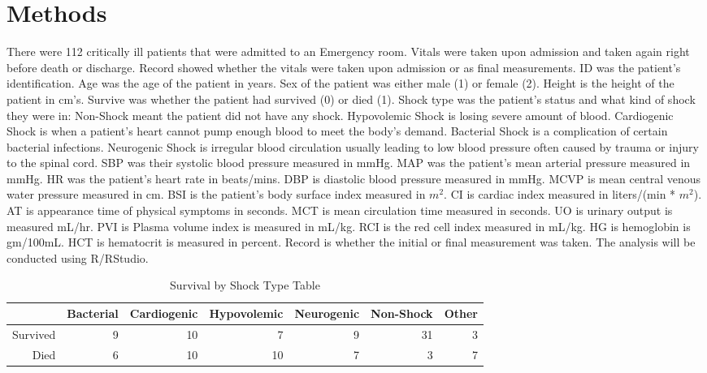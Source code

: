 \documentclass{article}\usepackage[]{graphicx}\usepackage[]{color}
\begin{document}
\section{Methods}
\qquad There were 112 critically ill patients that were admitted to an Emergency room. Vitals were taken upon admission and taken again right before death or discharge. Record showed whether the vitals were taken upon admission or as final measurements. ID was the patient's identification. Age was the age of the patient in years. Sex of the patient was either male (1) or female (2). Height is the height of the patient in cm's. Survive was whether the patient had survived (0) or died (1). Shock type was the patient's status and what kind of shock they were in: Non-Shock meant the patient did not have any shock. Hypovolemic Shock is losing severe amount of blood. Cardiogenic Shock is when a patient's heart cannot pump enough blood to meet the body's demand. Bacterial Shock is a complication of certain bacterial infections. Neurogenic Shock is irregular blood circulation usually leading to low blood pressure often caused by trauma or injury to the spinal cord. SBP was their systolic blood pressure measured in mmHg. MAP was the patient's mean arterial pressure measured in mmHg. HR was the patient's heart rate in beats/mins. DBP is diastolic blood pressure measured in mmHg. MCVP is mean central venous water pressure measured in cm. BSI is the patient's body surface index measured in $m^2$. CI is cardiac index measured in liters/(min * $m^2$). AT is appearance time of physical symptoms in seconds. MCT is mean circulation time measured in seconds. UO is urinary output is measured mL/hr. PVI is Plasma volume index is measured in mL/kg. RCI is the red cell index measured in mL/kg. HG is hemoglobin is gm/100mL. HCT is hematocrit is measured in percent. Record is whether the initial or final measurement was taken. The analysis will be conducted using R/RStudio. 


\begin{table}[ht]
\centering
\caption{Survival by Shock Type Table}
\label{shock}
\begin{tabular}{rrrrrrr}
  \hline
 & Bacterial & Cardiogenic & Hypovolemic & Neurogenic & Non-Shock & Other \\ 
  \hline
  Survived &   9 &  10 &   7 &   9 &  31 &   3 \\ 
  Died &   6 &  10 &  10 &   7 &   3 &   7 \\ 
   \hline
\end{tabular}
\end{table}
\end{document}
